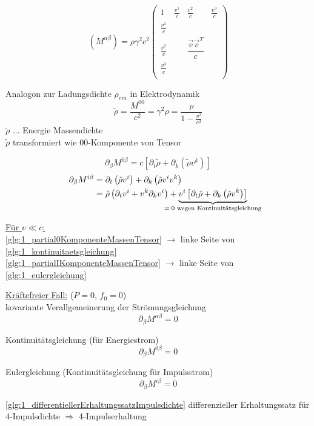 \documentclass[a4paper, 11pt]{article}
\numberwithin{equation}{section}
\newcommand{\ubtext}[2]{\underbrace{#1}_{\mathclap{\text{#2}}}}
\begin{document}
\begin{equation}
\left( M^{\alpha \beta} \right) = \rho \gamma^2 c^2 \begin{pmatrix}
1 & \frac{v^1}{c} & \frac{v^2}{c} & \frac{v^3}{c} \\
\frac{v^1}{c} \\
\frac{v^2}{c} & & \dfrac{\vec{v}\vec{v}^T}{c} \\
\frac{v^3}{c} \\
\end{pmatrix}
\end{equation}

Analogon zur Ladungsdichte $\rho_{em}$ in Elektrodynamik
\begin{equation}
\tilde{\rho} = \dfrac{M^{00}}{c^2} = \gamma^2 \rho = \dfrac{\rho}{1- \frac{v^2}{c^2}}
\end{equation}
$\tilde{\rho}$ $...$ Energie Massendichte\\
$\tilde{\rho}$ transformiert wie $00$-Komponente von Tensor

\begin{equation}\label{glg:1_partial0KomponenteMassenTensor}
\partial_\beta M^{0 \beta} = c \left[ \partial_t \tilde{\rho} + \partial_k \left(\tilde{\rho} v^k \right) \right]
\end{equation}
\begin{equation}\label{glg:1_partialIKomponenteMassenTensor}
\begin{aligned}
\partial_\beta M^{i \beta} &=  \partial_t \left( \tilde{\rho} v^i \right) + \partial_k \left(\tilde{\rho} v^i v^k \right) \\
&= \tilde{\rho} \left( \partial_t v^i + v^k \partial_k v^i \right) + \ubtext{ v^i \left[ \partial_t \tilde{\rho} + \partial_k \left(\tilde{\rho} v^k \right) \right]}{$=0$ wegen Kontinuitätsgleichung}
\end{aligned}
\end{equation}

\underline{Für $v \ll c$:}\\
\ref{glg:1_partial0KomponenteMassenTensor} $\rightarrow$ linke Seite von \ref{glg:1_kontinuitaetsgleichung}\\
\ref{glg:1_partialIKomponenteMassenTensor} $\rightarrow$ linke Seite von \ref{glg:1_eulergleichung}


\underline{Kräftefreier Fall:} ($P=0$, $f_0=0$)\\
kovariante Verallgemeinerung der Strömungsgleichung
\begin{equation}\label{glg:1_differentiellerErhaltungssatzImpulsdichte}
\partial_\beta M^{\alpha \beta} = 0
\end{equation} 

Kontinuitätsgleichung (für Energiestrom)
\begin{equation}
\partial_\beta M^{0 \beta} = 0
\end{equation}

Eulergleichung (Kontinuitätsgleichung für Impulsstrom)
\begin{equation}
\partial_\beta M^{i \beta} = 0
\end{equation}

\ref{glg:1_differentiellerErhaltungssatzImpulsdichte} differenzieller Erhaltungssatz für 4-Impulsdichte $\Rightarrow$ 4-Impulserhaltung
\end{document}
